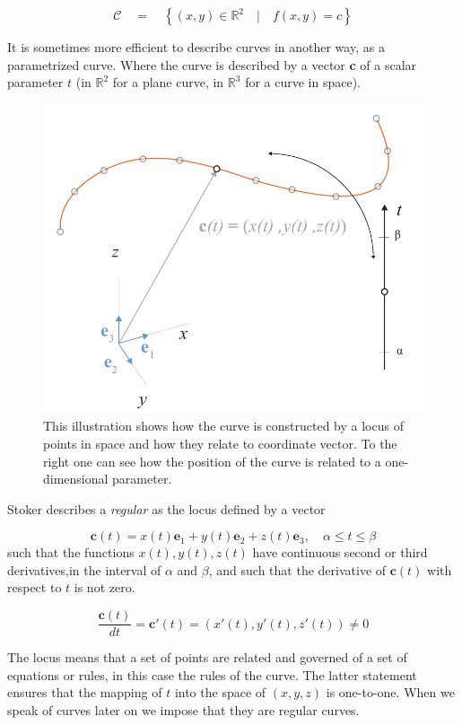 $$ \mathcal{C}\quad =\quad \left\{ (x,y) \in \mathbb{R}^2\quad |\quad f(x,y) = c \right\} $$


It is sometimes more efficient to describe curves in another way, as a parametrized curve. Where the curve is described by a vector \textbf{c} of a scalar parameter $t$ (in $\mathbb{R}^2$ for a plane curve, in $\mathbb{R}^3$ for a curve in space). 



\begin{figure}[H]
\centering
\includegraphics[width=0.7\linewidth ]{figure/Theory/CurveInSpace.pdf}              
\caption{This illustration shows how the curve is constructed by a locus of points in space and how they relate to coordinate vector. To the right one can see how the position of the curve is related to a one-dimensional parameter. }
\end{figure}

Stoker describes a \textit{regular} as the locus defined by a vector

\begin{equation}
\textbf{c}(t) = x(t)\textbf{e}_1 +  y(t)\textbf{e}_2+  z(t)\textbf{e}_3,\quad  \alpha \leq t \leq \beta
\end{equation}
 such that the functions  $x(t), y(t), z(t)$ have continuous second or third derivatives,in the interval of $\alpha$ and $\beta$, and such that the derivative of $\textbf{c}(t)$ with respect to $t$ is not zero.
 
 \begin{equation}
 \frac{\textbf{c}(t)}{dt} = \textbf{c}'(t)= (x'(t),y'(t),z'(t)) \neq 0
 \end{equation}

The locus means that a set of points are related and governed of a set of equations or rules, in this case the rules of the curve. The latter statement ensures that the mapping of $t$ into the space of $(x,y,z)$ is one-to-one. When we speak of curves later on we impose that they are regular curves.

